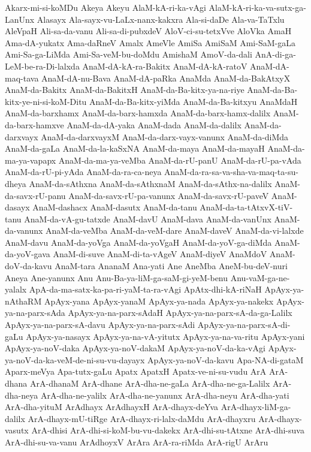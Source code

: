 {Akarx-mi-si-koMDu
Akeya
Akeyu
AlaM-kA-ri-ka-vAgi
AlaM-kA-ri-ka-va-sutx-ga-LanUnx
Alasayx
Ala-sayx-vu-LaLx-nanx-kakxra
Ala-si-daDe
Ala-va-TaTxlu
AleVpaH
Ali-sa-da-vanu
Ali-sa-di-pubxdeV
AloV-ci-su-tetxVve
AloVka
AmaH
Ama-dA-yukatx
Ama-daRneV
Amalx
AmeVle
AmiSa
AmiSaM
Ami-SaM-gaLa
Ami-Sa-ga-LiMda
Ami-Sa-veM-bu-doMdu
AmishaM
AmoV-da-dali
AnA-di-ga-LeM-be-ra-Di-lalxda
AnaM-dA-kA-ra-Bakitx
AnaM-dA-kA-ratoV
AnaM-dA-maq-tava
AnaM-dA-nu-Bava
AnaM-dA-paRka
AnaMda
AnaM-da-BakAtxyX
AnaM-da-Bakitx
AnaM-da-BakitxH
AnaM-da-Ba-kitx-ya-na-riye
AnaM-da-Ba-kitx-ye-ni-si-koM-Ditu
AnaM-da-Ba-kitx-yiMda
AnaM-da-Ba-kitxyu
AnaMdaH
AnaM-da-barxhamx
AnaM-da-barx-hamxda
AnaM-da-barx-hamx-dalilx
AnaM-da-barx-hamxve
AnaM-da-dA-yaka
AnaM-dada
AnaM-da-dalilx
AnaM-da-darxvayx
AnaM-da-darxvayxM
AnaM-da-darx-vayx-vanunx
AnaM-da-diMda
AnaM-da-gaLa
AnaM-da-la-kaSxNA
AnaM-da-maya
AnaM-da-mayaH
AnaM-da-ma-ya-vapapx
AnaM-da-ma-ya-veMba
AnaM-da-rU-panU
AnaM-da-rU-pa-vAda
AnaM-da-rU-pi-yAda
AnaM-da-ra-ca-neya
AnaM-da-ra-sa-va-sha-va-maq-ta-su-dheya
AnaM-da-sAthxna
AnaM-da-sAthxnaM
AnaM-da-sAthx-na-dalilx
AnaM-da-savx-rU-panu
AnaM-da-savx-rU-pa-vanunx
AnaM-da-savx-rU-paveV
AnaM-dasayx
AnaM-dashacx
AnaM-dasutx
AnaM-da-tanu
AnaM-da-ta-tAtxvX-tiV-tanu
AnaM-da-vA-gu-tatxde
AnaM-davU
AnaM-dava
AnaM-da-vanUnx
AnaM-da-vanunx
AnaM-da-veMba
AnaM-da-veM-dare
AnaM-daveV
AnaM-da-vi-lalxde
AnaM-davu
AnaM-da-yoVga
AnaM-da-yoVgaH
AnaM-da-yoV-ga-diMda
AnaM-da-yoV-gava
AnaM-di-suve
AnaM-di-ta-vAgeV
AnaM-diyeV
AnaMdoV
AnaM-doV-da-kavu
AnaM-tara
AnanaM
Ana-yati
Ane
AneMba
AneM-bu-deV-nuri
Aneya
Ane-yanunx
Anu
Anu-Ba-ya-liM-ga-saM-gi-yeM-benu
Anu-vaM-ga-ne-yalalx
ApA-da-ma-satx-ka-pa-ri-yaM-ta-ra-vAgi
ApAtx-dhi-kA-riNaH
ApAyx-ya-nAthaRM
ApAyx-yana
ApAyx-yanaM
ApAyx-ya-nada
ApAyx-ya-nakekx
ApAyx-ya-na-parx-sAda
ApAyx-ya-na-parx-sAdaH
ApAyx-ya-na-parx-sA-da-ga-Lalilx
ApAyx-ya-na-parx-sA-davu
ApAyx-ya-na-parx-sAdi
ApAyx-ya-na-parx-sA-di-gaLu
ApAyx-ya-nasayx
ApAyx-ya-na-vA-yitutx
ApAyx-ya-na-va-ritu
ApAyx-yani
ApAyx-ya-noV-daka
ApAyx-ya-noV-dakaM
ApAyx-ya-noV-da-ka-vAgi
ApAyx-ya-noV-da-ka-veM-de-ni-su-vu-dayayx
ApAyx-ya-noV-da-kavu
Apa-NA-di-gataM
Aparx-meVya
Apa-tutx-gaLu
Apatx
ApatxH
Apatx-ve-ni-su-vudu
ArA
ArA-dhana
ArA-dhanaM
ArA-dhane
ArA-dha-ne-gaLa
ArA-dha-ne-ga-Lalilx
ArA-dha-neya
ArA-dha-ne-yalilx
ArA-dha-ne-yanunx
ArA-dha-neyu
ArA-dha-yati
ArA-dha-yituM
ArAdhayx
ArAdhayxH
ArA-dhayx-deYva
ArA-dhayx-liM-ga-dalilx
ArA-dhayx-mU-tiRge
ArA-dhayx-ri-lalx-daMdu
ArA-dhayxru
ArA-dhayx-vasutx
ArA-dhisi
ArA-dhi-si-koM-bu-vu-dakekx
ArA-dhi-su-tAtxne
ArA-dhi-suva
ArA-dhi-su-va-vanu
ArAdhoyxV
ArAra
ArA-ra-riMda
ArA-rigU
ArAru
}
